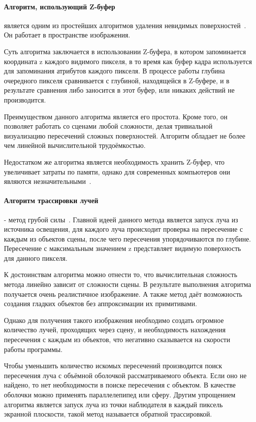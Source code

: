 \paragraph{Алгоритм, использующий Z-буфер} является одним из простейших алгоритмов удаления невидимых поверхностей~\cite{rogers}. Он работает в пространстве изображения. 
\par Суть алгоритма заключается в использовании Z-буфера, в котором запоминается координата z каждого видимого пикселя, в то время как буфер кадра используется для запоминания атрибутов каждого пикселя. В процессе работы глубина очередного пикселя сравнивается с глубиной, находящейся в Z-буфере, и в результате сравнения либо заносится в этот буфер, или никаких действий не производится.
\par Преимуществом данного алгоритма является его простота. Кроме того, он позволяет работать со сценами любой сложности, делая тривиальной визуализацию пересечений сложных поверхностей. Алгоритм обладает не более чем линейной вычислительной трудоёмкостью.
\par Недостатком же алгоритма является необходимость хранить Z-буфер, что увеличивает затраты по памяти, однако для современных компьютеров они являются незначительными~\cite{rogers}.

\paragraph{Алгоритм трассировки лучей} - метод грубой силы~\cite{rogers}. Главной идеей данного метода является запуск луча из источника освещения, для каждого луча происходит проверка на пересечение с каждым из объектов сцены, после чего пересечения упорядочиваются по глубине. Пересечение с максимальным значением z представляет видимую поверхность для данного пикселя.
\par К достоинствам алгоритма можно отнести то, что вычислительная сложность метода линейно зависит от сложности сцены. В результате выполнения алгоритма получается очень реалистичное изображение. А также метод даёт возможность создания гладких объектов без аппроксимации их примитивами.
\par Однако для получения такого изображения необходимо создать огромное количество лучей, проходящих через сцену, и необходимость нахождения пересечения с каждым из объектов, что негативно сказывается на скорости работы программы.
\par Чтобы уменьшить количество искомых пересечений производится поиск пересечения луча с объёмной оболочкой рассматриваемого объекта. Если оно не найдено, то нет необходимости в поиске пересечения с объектом. В качестве оболочки можно применять параллелепипед или сферу. Другим упрощением алгоритма является запуск луча из точки наблюдателя в каждый пиксель экранной плоскости, такой метод называется обратной трассировкой.
